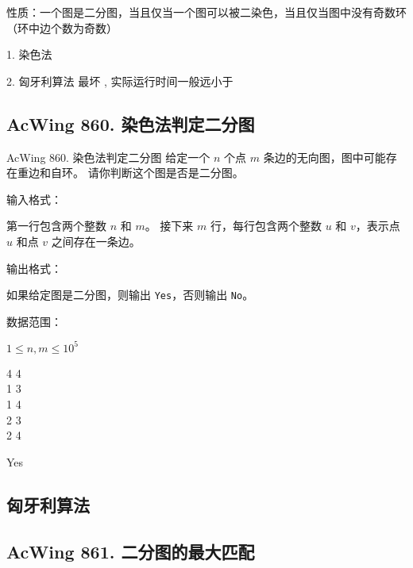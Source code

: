 性质：一个图是二分图，当且仅当一个图可以被二染色，当且仅当图中没有奇数环（环中边个数为奇数）

1. 染色法 

2. 匈牙利算法 最坏 , 实际运行时间一般远小于 

\subsection{AcWing 860. 染色法判定二分图}
\begin{titledbox}{AcWing 860. 染色法判定二分图}
    给定一个 $n$ 个点 $m$ 条边的无向图，图中可能存在重边和自环。 请你判断这个图是否是二分图。

    输入格式：

    第一行包含两个整数 $n$ 和 $m$。 接下来 $m$ 行，每行包含两个整数 $u$ 和 $v$，表示点 $u$ 和点 $v$ 之间存在一条边。

    输出格式：

    如果给定图是二分图，则输出 \lstinline{Yes}，否则输出 \lstinline{No}。

    数据范围：

    $1 \le n,m \le 10^5$

    \begin{inputblock}
        4 4 \\
        1 3 \\
        1 4 \\
        2 3 \\
        2 4
    \end{inputblock}
    \begin{outputblock}
        Yes
    \end{outputblock}
\end{titledbox}

\subsection{匈牙利算法}

\subsection{AcWing 861. 二分图的最大匹配}


